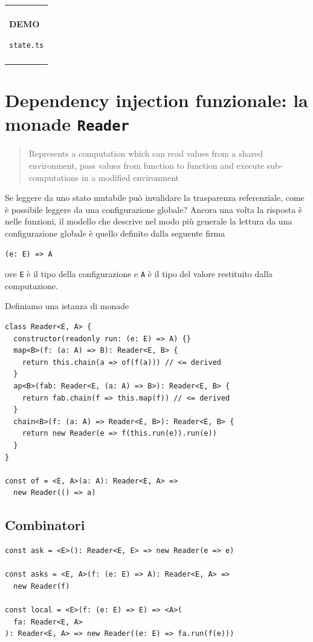 \documentclass[12pt]{article}
\newenvironment{demo}
    {\begin{center}
    \begin{tabular}{|p{0.9\textwidth}|}
    \hline\\
    }
    {
    \\\\\hline
    \end{tabular}
    \end{center}
    }
\begin{document}
\begin{demo}
\begin{center}
\textbf{DEMO}

\texttt{state.ts}
\end{center}
\end{demo}

\newpage

\section{Dependency injection funzionale: la monade \texttt{Reader}}

\begin{quote}
Represents a computation which can read values from a shared environment, pass values from function to function
and execute sub-computations in a modified environment
\end{quote}

Se leggere da uno stato mutabile può invalidare la trasparenza referenziale, come è possibile leggere da una configurazione globale?
Ancora una volta la risposta è nelle funzioni, il modello che descrive nel modo più generale la lettura da una configurazione globale
è quello definito dalla seguente firma

\begin{verbatim}
(e: E) => A
\end{verbatim}

ove \texttt{E} è il tipo della configurazione e \texttt{A} è il tipo del valore restituito dalla computazione.

Definiamo una istanza di monade

\begin{verbatim}
class Reader<E, A> {
  constructor(readonly run: (e: E) => A) {}
  map<B>(f: (a: A) => B): Reader<E, B> {
    return this.chain(a => of(f(a))) // <= derived
  }
  ap<B>(fab: Reader<E, (a: A) => B>): Reader<E, B> {
    return fab.chain(f => this.map(f)) // <= derived
  }
  chain<B>(f: (a: A) => Reader<E, B>): Reader<E, B> {
    return new Reader(e => f(this.run(e)).run(e))
  }
}

const of = <E, A>(a: A): Reader<E, A> =>
  new Reader(() => a)
\end{verbatim}

\subsection{Combinatori}

\begin{verbatim}
const ask = <E>(): Reader<E, E> => new Reader(e => e)

const asks = <E, A>(f: (e: E) => A): Reader<E, A> =>
  new Reader(f)

const local = <E>(f: (e: E) => E) => <A>(
  fa: Reader<E, A>
): Reader<E, A> => new Reader((e: E) => fa.run(f(e)))
\end{verbatim}
\end{document}
